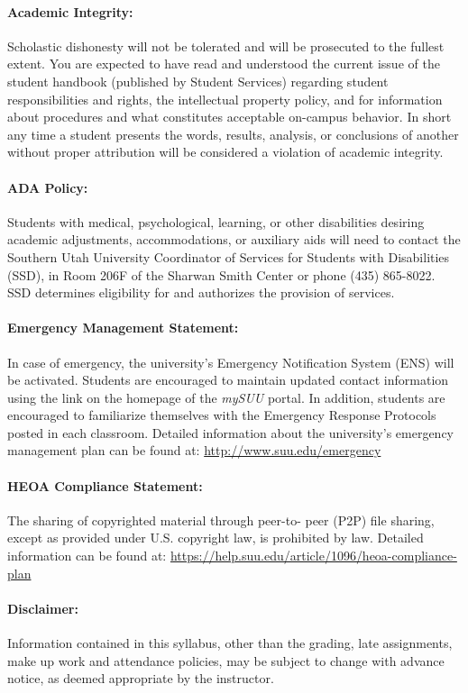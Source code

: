 \documentclass[12pt, letterpaper]{article}
\begin{document}
\paragraph{Academic Integrity:}
Scholastic dishonesty will not be tolerated and will be prosecuted to the fullest extent. You are expected to have read and understood the current issue of the student handbook (published by Student Services) regarding student responsibilities and rights, the intellectual property policy, and for information about procedures and what constitutes acceptable on-campus behavior. In short any time a student presents the words, results, analysis, or conclusions of another without proper attribution will be considered a violation of academic integrity.

\paragraph{ADA Policy:}
Students with medical, psychological, learning, or other disabilities desiring academic adjustments, accommodations, or auxiliary aids will need to contact the Southern Utah University Coordinator of Services for Students with Disabilities (SSD), in Room 206F of the Sharwan Smith Center or phone (435) 865-8022. SSD determines eligibility for and authorizes the provision of services.

\paragraph{Emergency Management Statement:}
In case of emergency, the university's Emergency Notification System (ENS) will be activated. Students are encouraged to maintain updated contact information using the link on the homepage of the \emph{mySUU} portal. In addition, students are encouraged to familiarize themselves with the Emergency Response Protocols posted in each classroom. Detailed information about the university's emergency management plan can be found at: \href{http://www.suu.edu/emergency}{http://www.suu.edu/emergency}

\paragraph{HEOA Compliance Statement:}
The sharing of copyrighted material through peer-to- peer (P2P) file sharing, except as provided under U.S. copyright law, is prohibited by law. Detailed information can be found at: \href{https://help.suu.edu/article/1096/heoa-compliance-plan}{https://help.suu.edu/article/1096/heoa-compliance-plan}

\paragraph{Disclaimer:}
Information contained in this syllabus, other than the grading, late assignments, make up work and attendance policies, may be subject to change with advance notice, as deemed appropriate by the instructor.
\end{document}

